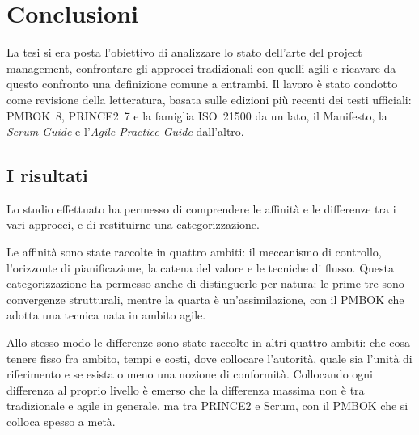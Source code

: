 \chapter*{Conclusioni}


La tesi si era posta l'obiettivo di analizzare lo stato dell'arte del project
management, confrontare gli approcci tradizionali con quelli agili e ricavare
da questo confronto una definizione comune a entrambi. Il lavoro \`e stato
condotto come revisione della letteratura, basata sulle edizioni pi\`u recenti
dei testi ufficiali: PMBOK~8, PRINCE2~7 e la famiglia ISO~21500 da un lato, il
Manifesto, la \emph{Scrum Guide} e l'\emph{Agile Practice Guide} dall'altro.

\section*{I risultati}

Lo studio effettuato ha permesso di comprendere le affinit\`a e le differenze
tra i vari approcci, e di restituirne una categorizzazione.

Le affinit\`a sono state raccolte in quattro ambiti: il meccanismo di controllo,
l'orizzonte di pianificazione, la catena del valore e le tecniche di flusso.
Questa categorizzazione ha permesso anche di distinguerle per natura: le prime
tre sono convergenze strutturali, mentre la quarta \`e un'assimilazione, con il PMBOK
che adotta una tecnica nata in ambito agile.

Allo stesso modo le differenze sono state raccolte in altri quattro ambiti: che cosa
tenere fisso fra ambito, tempi e costi, dove collocare l'autorit\`a, quale sia
l'unit\`a di riferimento e se esista o meno una nozione di conformit\`a.
Collocando ogni differenza al proprio livello \`e emerso che la differenza
massima non \`e tra tradizionale e agile in generale, ma tra PRINCE2 e Scrum,
con il PMBOK che si colloca spesso a met\`a.

